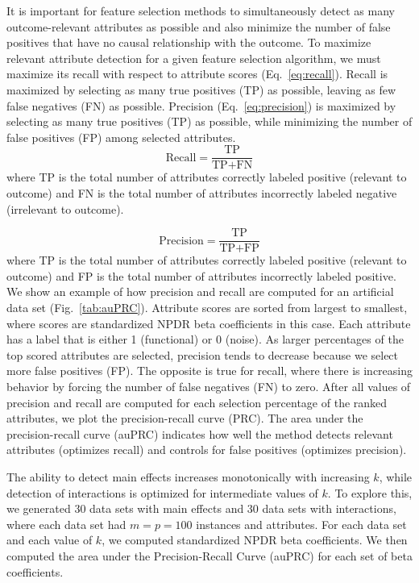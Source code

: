 \documentclass[10pt,letterpaper]{article}
\begin{document}
It is important for feature selection methods to simultaneously detect as many outcome-relevant attributes as possible and also minimize the number of false positives that have no causal relationship with the outcome. To maximize relevant attribute detection for a given feature selection algorithm, we must maximize its recall with respect to attribute scores (Eq.~\ref{eq:recall}). Recall is maximized by selecting as many true positives (TP) as possible, leaving as few false negatives (FN) as possible. Precision (Eq.~\ref{eq:precision}) is maximized by selecting as many true positives (TP) as possible, while minimizing the number of false positives (FP) among selected attributes.
%
\begin{equation}\label{eq:recall}
\text{Recall} = \frac{\text{TP}}{\text{TP} + \text{FN}}
\end{equation}
%
where TP is the total number of attributes correctly labeled positive (relevant to outcome) and FN is the total number of attributes incorrectly labeled negative (irrelevant to outcome).

\begin{equation}\label{eq:precision}
\text{Precision} = \frac{\text{TP}}{\text{TP}+\text{FP}}
\end{equation}
%
where TP is the total number of attributes correctly labeled positive (relevant to outcome) and FP is the total number of attributes incorrectly labeled positive. We show an example of how precision and recall are computed for an artificial data set (Fig.~\ref{tab:auPRC}). Attribute scores are sorted from largest to smallest, where scores are standardized NPDR beta coefficients in this case. Each attribute has a label that is either 1 (functional) or 0 (noise). As larger percentages of the top scored attributes are selected, precision tends to decrease because we select more false positives (FP). The opposite is true for recall, where there is increasing behavior by forcing the number of false negatives (FN) to zero. After all values of precision and recall are computed for each selection percentage of the ranked attributes, we plot the precision-recall curve (PRC). The area under the precision-recall curve (auPRC) indicates how well the method detects relevant attributes (optimizes recall) and controls for false positives (optimizes precision).

The ability to detect main effects increases monotonically with increasing $k$, while detection of interactions is optimized for intermediate values of $k$. To explore this, we generated 30 data sets with main effects and 30 data sets with interactions, where each data set had $m=p=100$ instances and attributes. For each data set and each value of $k$, we computed standardized NPDR beta coefficients. We then computed the area under the Precision-Recall Curve (auPRC) for each set of beta coefficients.
\end{document}
